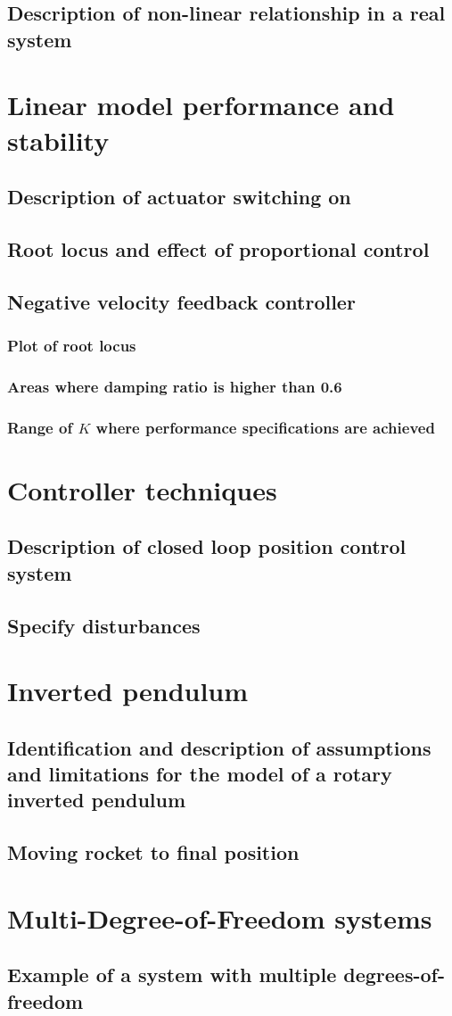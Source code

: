\documentclass[11pt]{article}
\numberwithin{equation}{section}
\begin{document}
\subsection{Description of non-linear relationship in a real system}
\section{Linear model performance and stability}
\subsection{Description of actuator switching on}
\subsection{Root locus and effect of proportional control}
\subsection{Negative velocity feedback controller}
\subsubsection{Plot of root locus}
\subsubsection{Areas where damping ratio is higher than 0.6}
\subsubsection{Range of $K$ where performance specifications are achieved}
\section{Controller techniques}
\subsection{Description of closed loop position control system}
\subsection{Specify disturbances}
\section{Inverted pendulum}
\subsection{Identification and description of assumptions and limitations for the model of a rotary inverted pendulum}
\subsection{Moving rocket to final position}
\section{Multi-Degree-of-Freedom systems}
\subsection{Example of a system with multiple degrees-of-freedom}
\end{document}
